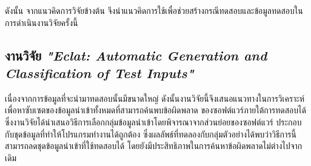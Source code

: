 ดังนั้น จากแนวคิดการวิจัยข้างต้น จึงนำแนวคิดการใช้{\StaticInformation}เพื่อช่วยสร้างกรณีทดสอบและข้อมูลทดสอบในการดำเนินงานวิจัยครั้งนี้

\subsection{งานวิจัย {\it "Eclat: Automatic Generation and Classification of Test Inputs"} \cite{Heaton2000}}
\label{sec:sub:eclat}

เนื่องจากการข้อมูลที่จะนำมาทดสอบนั้นมีขนาดใหญ่ ดังนั้นงานวิจัยนี้จึงเสนอแนวทางในการวิเคราะห์เพื่อหาซับเซตของข้อมูลนำเข้าทั้งหมดที่สามารถค้นพบข้อผิดพลาด
ของซอฟต์แวร์ภายใต้การทดสอบได้ ซึ่งงานวิจัยได้นำเสนอวิธีการเลือกกลุ่มข้อมูลนำเข้าโดยพิจารณาจากส่วนย่อยของซอฟต์แวร์ 
ประกอบกับชุดข้อมูลที่ทำให้โปรแกรมทำงานได้ถูกต้อง ซึ่งผลลัพธ์ที่ทดลองกับกลุ่มตัวอย่างได้พบว่าวิธีการนี้สามารถลดชุดข้อมูลนำเข้าที่ใช้ทดสอบได้
โดยยังมีประสิทธิภาพในการค้นหาข้อผิดพลาดไม่ต่างไปจากเดิม

\clearpage

